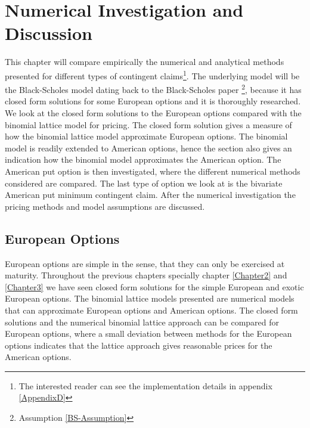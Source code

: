 
\chapter{Numerical Investigation and Discussion} %

\label{Chapter6} %

This chapter will compare empirically the numerical and analytical methods presented for different types of contingent claims\footnote{The interested reader can see the implementation details in appendix \ref{AppendixD}}. The underlying model will be the Black-Scholes model dating back to the Black-Scholes paper \parencite{B-S-Paper}\footnote{Assumption \ref{BS-Assumption}}, because it has closed form solutions for some European options and it is thoroughly researched.\\

We look at the closed form solutions to the European options compared with the binomial lattice model for pricing. The closed form solution gives a measure of how the binomial lattice model approximate European options. The binomial model is readily extended to American options, hence the section also gives an indication how the binomial model approximates the American option. The American put option is then investigated, where the different numerical methods considered are compared. The last type of option we look at is the bivariate American put minimum contingent claim. After the numerical investigation the pricing methods and model assumptions are discussed.


\section{European Options}\label{EuroOption}
European options are simple in the sense, that they can only be exercised at maturity. Throughout the previous chapters specially chapter \ref{Chapter2} and \ref{Chapter3} we have seen closed form solutions for the simple European and exotic European options. The binomial lattice models presented are numerical models that can approximate European options and American options. The closed form solutions and the numerical binomial lattice approach can be compared for European options, where a small deviation between methods for the European options indicates that the lattice approach gives reasonable prices for the American options.\\

